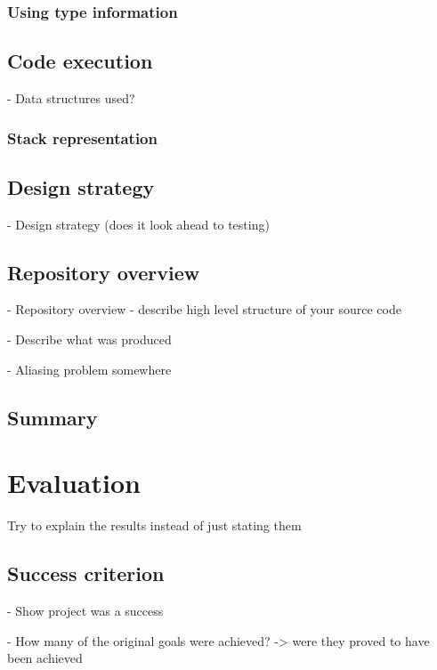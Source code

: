 \documentclass[12pt,a4paper]{report}
\begin{document}
\subsection{Using type information}

\section{Code execution}

- Data structures used?

\subsection{Stack representation}

\section{Design strategy}

- Design strategy (does it look ahead to testing)

\section{Repository overview}

- Repository overview - describe high level structure of your source code 

\hrulefill 

- Describe what was produced

- Aliasing problem somewhere


\section{Summary}


\chapter{Evaluation} 

Try to explain the results instead of just stating them

\section{Success criterion}

- Show project was a success

- How many of the original goals were achieved? -> were they proved to have been achieved
\end{document}
